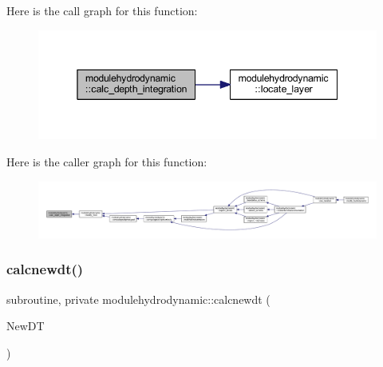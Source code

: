 Here is the call graph for this function\+:\nopagebreak
\begin{figure}[H]
\begin{center}
\leavevmode
\includegraphics[width=345pt]{namespacemodulehydrodynamic_a6026ae01a3e1aa6a649387589a05431c_cgraph}
\end{center}
\end{figure}
Here is the caller graph for this function\+:\nopagebreak
\begin{figure}[H]
\begin{center}
\leavevmode
\includegraphics[width=350pt]{namespacemodulehydrodynamic_a6026ae01a3e1aa6a649387589a05431c_icgraph}
\end{center}
\end{figure}
\mbox{\label{namespacemodulehydrodynamic_a63b7d9d86f7746faae381352cdb4ceda}} 
\subsubsection{\texorpdfstring{calcnewdt()}{calcnewdt()}}
{\footnotesize\ttfamily subroutine, private modulehydrodynamic\+::calcnewdt (\begin{DoxyParamCaption}\item[{type(t\+\_\+newdt)}]{New\+DT }\end{DoxyParamCaption})\hspace{0.3cm}{\ttfamily [private]}}

